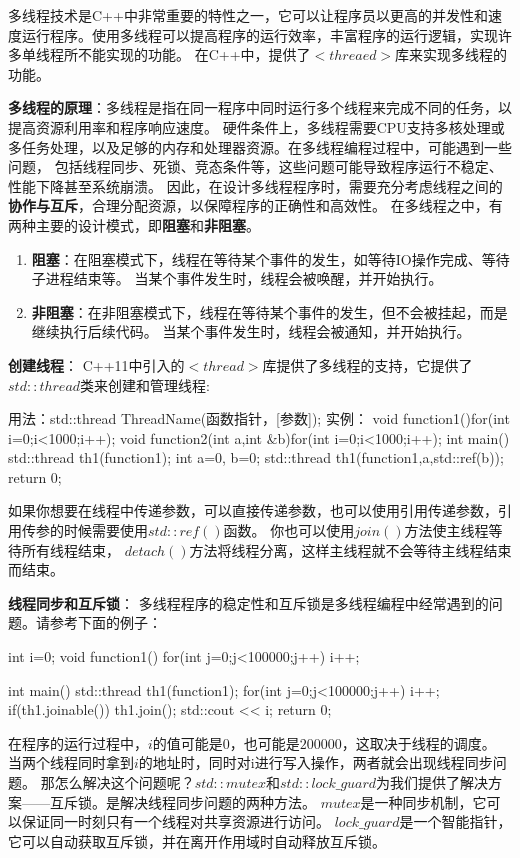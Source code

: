 多线程技术是C++中非常重要的特性之一，它可以让程序员以更高的并发性和速度运行程序。使用多线程可以提高程序的运行效率，丰富程序的运行逻辑，实现许多单线程所不能实现的功能。
在C++中，提供了$<threaed>$库来实现多线程的功能。

\textbf{多线程的原理}：多线程是指在同一程序中同时运行多个线程来完成不同的任务，以提高资源利用率和程序响应速度。
硬件条件上，多线程需要CPU支持多核处理或多任务处理，以及足够的内存和处理器资源。在多线程编程过程中，可能遇到一些问题，
包括线程同步、死锁、竞态条件等，这些问题可能导致程序运行不稳定、性能下降甚至系统崩溃。
因此，在设计多线程程序时，需要充分考虑线程之间的\textbf{协作与互斥}，合理分配资源，以保障程序的正确性和高效性。
在多线程之中，有两种主要的设计模式，即\textbf{阻塞}和\textbf{非阻塞}。

\begin{enumerate}
    \item \textbf{阻塞}：在阻塞模式下，线程在等待某个事件的发生，如等待IO操作完成、等待子进程结束等。
当某个事件发生时，线程会被唤醒，并开始执行。

    \item \textbf{非阻塞}：在非阻塞模式下，线程在等待某个事件的发生，但不会被挂起，而是继续执行后续代码。
当某个事件发生时，线程会被通知，并开始执行。
\end{enumerate}


\textbf{创建线程}：
C++11中引入的$<thread>$库提供了多线程的支持，它提供了$std::thread$类来创建和管理线程:

\begin{tcode}
用法：std::thread ThreadName(函数指针，[参数]);
实例：
void function1(){for(int i=0;i<1000;i++);}
void function2(int a,int &b){for(int i=0;i<1000;i++);}
int main() {
    std::thread th1(function1);
    int a=0, b=0;
    std::thread th1(function1,a,std::ref(b));
    return 0;
}
\end{tcode}

如果你想要在线程中传递参数，可以直接传递参数，也可以使用引用传递参数，引用传参的时候需要使用$std::ref()$函数。
你也可以使用$join()$方法使主线程等待所有线程结束，
$detach()$方法将线程分离，这样主线程就不会等待主线程结束而结束。

\textbf{线程同步和互斥锁}：
多线程程序的稳定性和互斥锁是多线程编程中经常遇到的问题。请参考下面的例子：
\begin{tcode}
int i=0;
void function1(){
    for(int j=0;j<100000;j++)
        i++;
}

int main() {
    std::thread th1(function1);
    for(int j=0;j<100000;j++)
        i++;
    if(th1.joinable())
        th1.join();
    std::cout << i;
    return 0;
}
\end{tcode}
在程序的运行过程中，$i$的值可能是$0$，也可能是$200000$，这取决于线程的调度。
当两个线程同时拿到$i$的地址时，同时对i进行写入操作，两者就会出现线程同步问题。
那怎么解决这个问题呢？$std::mutex$和$std::lock\_guard$为我们提供了解决方案——互斥锁。是解决线程同步问题的两种方法。
$mutex$是一种同步机制，它可以保证同一时刻只有一个线程对共享资源进行访问。
$lock\_guard$是一个智能指针，它可以自动获取互斥锁，并在离开作用域时自动释放互斥锁。

